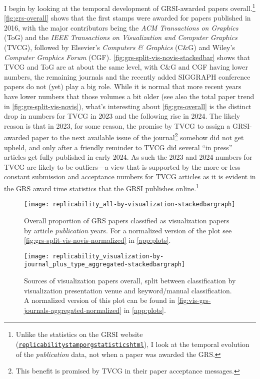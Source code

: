 \documentclass[conference,svgnames]{vgtc}                     %
\begin{document}
I begin by looking at the temporal development of GRSI-awarded papers overall.\footnote{\label{foot:grsi-statistics}Unlike the statistics on the GRSI website (\href{https://www.replicabilitystamp.org/statistics.html}{\texttt{replicabilitystamporg\discretionary{/}{}{/}statisticshtml}}), I look at the temporal evolution of the \emph{publication} data, not when a paper was awarded the GRS.} \autoref{fig:grs-overall} shows that the first stamps were awarded for papers published in 2016, with the major contributors being the \emph{ACM Transactions on Graphics} (ToG) and the \emph{IEEE Transactions on Visualization and Computer Graphics} (TVCG), followed by Elsevier's \emph{Computers \& Graphics} (C\&G) and Wiley's \emph{Computer Graphics Forum} (CGF). \autoref{fig:grs-split-vis-novis-stackedbar} shows that TVCG and ToG are at about the same level, with C\&G and CGF having lower numbers, the remaining journals and the recently added SIGGRAPH conference papers do not (yet) play a big role. While it is normal that more recent years have lower numbers that those volumes a bit older (see also the total paper trend in \autoref{fig:grs-split-vis-novis}), what's interesting about \autoref{fig:grs-overall} is the distinct drop in numbers for TVCG in 2023 and the following rise in 2024. The likely reason is that in 2023, for some reason, the promise by TVCG to assign a GRSI-awarded paper to the next available issue of the journal\footnote{\label{foot:tvcg-fast-track}This benefit is promised by TVCG in their paper acceptance messages.} somehow did not get upheld, and only after a friendly reminder to TVCG did several ``in press'' articles get fully published in early 2024. As such the 2023 and 2024 numbers for TVCG are likely to be outliers---a view that is supported by the more or less constant submission and acceptance numbers for TVCG articles as it is evident in the GRS award time statistics that the GRSI publishes online.\textsuperscript{\ref{foot:grsi-statistics}}

\begin{figure}
	\centering
	\texttt{[image: replicability\_all-by-visualization-stackedbargraph]}
	\caption{Overall proportion of GRS papers classified as visualization papers by article \emph{publication} years. For a normalized version of the plot see \autoref{fig:grs-split-vis-novis-normalized} in \autoref{app:plots}.}
	\label{fig:grs-split-vis-novis}
\end{figure}

\begin{figure}
	\centering
	\texttt{[image: replicability\_visualization-by-journal\_plus\_type\_aggregated-stackedbargraph]}
	\caption{Sources of visualization papers overall, split between classification by visualization presentation venue and keyword/manual classification. A normalized version of this plot can be found in \autoref{fig:vis-grs-journals-aggregated-normalized} in \autoref{app:plots}.}
	\label{fig:vis-grs-journals-aggregated}
\end{figure}
\end{document}
